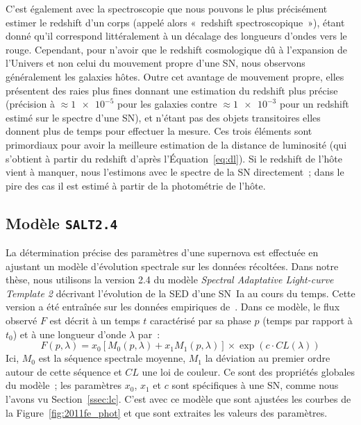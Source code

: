 \documentclass[../main/main.tex]{subfiles}
\begin{document}
C'est également avec la spectroscopie que nous pouvons le plus précisément
estimer le redshift d'un corps (appelé alors «~redshift spectroscopique~»),
étant donné qu'il correspond littéralement à un décalage des longueurs d'ondes
vers le rouge. Cependant, pour n'avoir que le redshift cosmologique dû à
l'expansion de l'Univers et non celui du mouvement propre d'une SN, nous
observons généralement les galaxies hôtes. Outre cet avantage de mouvement
propre, elles présentent des raies plus fines donnant une estimation du redshift
plus précise (précision à $\approx \num{1e-5}$ pour les galaxies contre $\approx
\num{1e-3}$ pour un redshift estimé sur le spectre d'une SN), et n'étant pas des
objets transitoires elles donnent plus de temps pour effectuer la mesure. Ces
trois éléments sont primordiaux pour avoir la meilleure estimation de la
distance de luminosité (qui s'obtient à partir du redshift d'après
l'Équation~\ref{eq:dl}). Si le redshift de l'hôte vient à manquer, nous
l'estimons avec le spectre de la SN directement~; dans le pire des cas il est
estimé à partir de la photométrie de l'hôte.

\subsection{Modèle \texttt{SALT2.4}}\label{ssec:salt}

La détermination précise des paramètres d'une supernova est effectuée en
ajustant un modèle d'évolution spectrale sur les données récoltées. Dans notre
thèse, nous utilisons la version 2.4 du modèle \textit{Spectral Adaptative
Light-curve Template 2} \citep[\texttt{SALT2},][]{guy2007} décrivant l'évolution
de la SED d'une SN~Ia au cours du temps. Cette version a été entraînée sur les
données empiriques de~\cite{betoule2014}. Dans ce modèle, le flux observé $F$
est décrit à un temps $t$ caractérisé par sa phase $p$ (temps par rapport à
$t_0$) et à une longueur d'onde $\lambda$ par~:
\begin{equation}\label{eq:saltf}
    F(p,\lambda) = x_0\left[ M_0(p,\lambda) + x_1M_1(p,\lambda)
    \right]\times \exp(c\cdot CL(\lambda))
\end{equation}
Ici, $M_0$ est la séquence spectrale moyenne, $M_1$ la déviation au premier
ordre autour de cette séquence et $CL$ une loi de couleur. Ce sont des
propriétés globales du modèle~; les paramètres $x_0$, $x_1$ et $c$ sont
spécifiques à une SN, comme nous l'avons vu Section~\ref{ssec:lc}. C'est avec ce
modèle que sont ajustées les courbes de la Figure~\ref{fig:2011fe_phot} et que
sont extraites les valeurs des paramètres.
\end{document}
